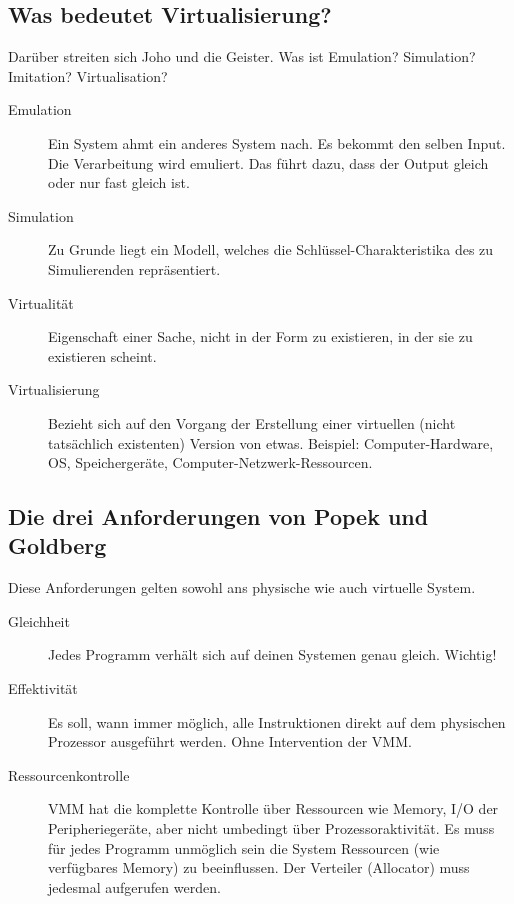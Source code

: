 \subsection{Was bedeutet Virtualisierung?}
Darüber streiten sich Joho und die Geister. Was ist Emulation? Simulation? Imitation?  Virtualisation?
\begin{description}
	\item[Emulation] Ein System ahmt ein anderes System nach. Es bekommt den selben Input. Die Verarbeitung wird emuliert. Das führt dazu, dass der Output gleich oder nur fast gleich ist.
	\item[Simulation] Zu Grunde liegt ein Modell, welches die Schlüssel-Charakteristika des zu Simulierenden repräsentiert.
	\item[Virtualität] Eigenschaft einer Sache, nicht in der Form zu existieren, in der sie zu existieren scheint.
	\item[Virtualisierung] Bezieht sich auf den Vorgang der Erstellung einer virtuellen (nicht tatsächlich existenten) Version von etwas. Beispiel: Computer-Hardware, OS, Speichergeräte, Computer-Netzwerk-Ressourcen. 
\end{description}

\subsection{Die drei Anforderungen von Popek und Goldberg}
Diese Anforderungen gelten sowohl ans physische wie auch virtuelle System.
\begin{description}
	\item[Gleichheit] Jedes Programm verhält sich auf deinen Systemen genau gleich. Wichtig!
	\item[Effektivität] Es soll, wann immer möglich, alle Instruktionen direkt auf dem physischen Prozessor ausgeführt werden. Ohne Intervention der VMM.
	\item[Ressourcenkontrolle] VMM hat die komplette Kontrolle über Ressourcen wie Memory, I/O der Peripheriegeräte, aber nicht umbedingt über Prozessoraktivität. Es muss für jedes Programm unmöglich sein die System Ressourcen (wie verfügbares Memory) zu beeinflussen. Der Verteiler (Allocator) muss jedesmal aufgerufen werden.
\end{description}

